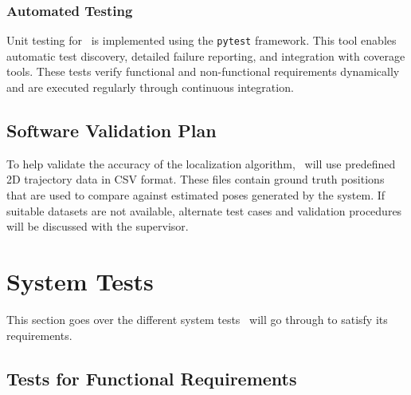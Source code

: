 \documentclass[12pt, titlepage]{article}
\begin{document}
\subsubsection{Automated Testing}
Unit testing for \progname~is implemented using the \texttt{pytest} framework. This tool enables automatic test discovery, detailed failure reporting, and integration with coverage tools. These tests verify functional and non-functional requirements dynamically and are executed regularly through continuous integration.





\subsection{Software Validation Plan}\label{plan_software}

To help validate the accuracy of the localization algorithm, \progname~will use predefined 2D trajectory data in CSV format. These files contain ground truth positions that are used to compare against estimated poses generated by the system. If suitable datasets are not available, alternate test cases and validation procedures will be discussed with the supervisor.

\section{System Tests}\label{sec_sys-tests}

This section goes over the different system tests \progname~will go through to satisfy its requirements.

\subsection{Tests for Functional Requirements}
\end{document}

